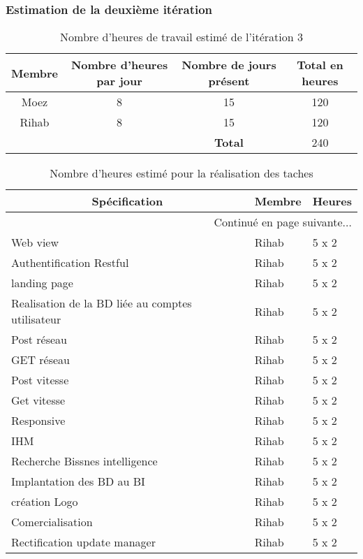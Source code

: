 \subsubsection{Estimation de la deuxième itération}
\begin{table}[htbp]
    \centering
    \begin{tabular}{| c | c | c | c |}
\hline
\textbf{Membre} & \textbf{Nombre d'heures par jour} & \textbf{Nombre de jours présent} & \textbf{Total en heures} \\ \hline
\hline

Moez & 8 & 15 & 120\\ \hline
Rihab & 8 & 15 & 120 \\ \hline
\multicolumn{2}{c|}{} & \textbf{Total} & 240 \\ \cline{3-4}
    \end{tabular}
    \caption{Nombre d'heures de travail estimé de l'itération 3}
    \label{tab:sprint3-capacity}
\end{table}

\begin{center}
    \begin{longtable}{| l | l | l |}
        \caption{Nombre d'heures estimé pour la réalisation des taches}
        \label{tab:sprint3-estimation} \\

 \hline
 \multicolumn{1}{|c}{\textbf{Spécification}} &
 \multicolumn{1}{|c}{\textbf{Membre}} &
 \multicolumn{1}{|c|}{\textbf{Heures}} \\ \hline
 \endhead

 \hline \multicolumn{3}{|r|}{{Continué en page suivante$\dotsc$}} \\ \hline
 \endfoot

 \hline \hline
 \endlastfoot

\hline
Web view& Rihab & 5 x 2 \\ \hline
Authentification Restful& Rihab & 5 x 2 \\ \hline
landing page& Rihab & 5 x 2 \\ \hline
Realisation de la BD liée au comptes utilisateur& Rihab & 5 x 2 \\ \hline
Post réseau& Rihab & 5 x 2 \\ \hline
GET réseau& Rihab & 5 x 2 \\ \hline
Post vitesse& Rihab & 5 x 2 \\ \hline
Get vitesse& Rihab & 5 x 2 \\ \hline
Responsive& Rihab & 5 x 2 \\ \hline
IHM & Rihab & 5 x 2 \\ \hline
Recherche Bissnes intelligence& Rihab & 5 x 2 \\ \hline
Implantation des BD au BI& Rihab & 5 x 2 \\ \hline
création Logo& Rihab & 5 x 2 \\ \hline
Comercialisation& Rihab & 5 x 2 \\ \hline
Rectification update manager& Rihab & 5 x 2 \\ \hline
\end{longtable}
\end{center}

